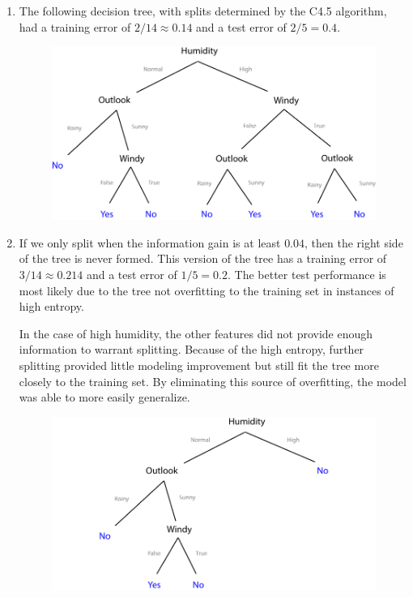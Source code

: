 \documentclass{article}
\begin{document}
\begin{enumerate}
	\item
		The following decision tree, with splits determined by the C4.5 algorithm, had a training error of $2/14 \approx 0.14$ and a test error of  $2/5 = 0.4$.
		\begin{figure}[H]
			\centering
			\includegraphics[scale=0.75]{img/tree.pdf}
		\end{figure}
	
	\item
		If we only split when the information gain is at least $0.04$, then the right side of the tree is never formed. This version of the tree has a training error of $3/14 \approx 0.214$ and a test error of $1/5 = 0.2$. The better test performance is most likely due to the tree not overfitting to the training set in instances of high entropy.

		In the case of high humidity, the other features did not provide enough information to warrant splitting. Because of the high entropy, further splitting provided little modeling improvement but still fit the tree more closely to the training set. By eliminating this source of overfitting, the model was able to more easily generalize.
		\begin{figure}[H]
			\centering
			\includegraphics[scale=0.75]{img/pruned.pdf}
		\end{figure}
	

\end{enumerate}
\end{document}
